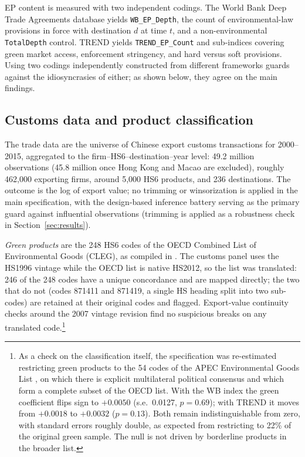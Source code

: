 \documentclass[12pt]{article}
\begin{document}
EP content is measured with two independent codings. The World Bank Deep Trade
Agreements database \citep{hofmann2017} yields \texttt{WB\_EP\_Depth}, the count of
environmental-law provisions in force with destination $d$ at time $t$, and a
non-environmental \texttt{TotalDepth} control. TREND \citep{morin2018} yields
\texttt{TREND\_EP\_Count} and sub-indices covering green market access, enforcement
stringency, and hard versus soft provisions. Using two codings independently constructed
from different frameworks guards against the idiosyncrasies of either; as shown below,
they agree on the main findings.

\subsection{Customs data and product classification}

The trade data are the universe of Chinese export customs transactions for 2000--2015,
aggregated to the firm--HS6--destination--year level: 49.2 million observations (45.8
million once Hong Kong and Macao are excluded), roughly 462{,}000 exporting firms,
around 5{,}000 HS6 products, and 236 destinations. The outcome is the log of export
value; no trimming or winsorization is applied in the main specification, with the
design-based inference battery serving as the primary guard against influential
observations (trimming is applied as a robustness check in Section~\ref{sec:results}).

\emph{Green products} are the 248 HS6 codes of the OECD Combined List of Environmental
Goods (CLEG), as compiled in \citet{sauvage2014}. The customs panel uses the HS1996
vintage while the OECD list is native HS2012, so the list was translated: 246 of the 248
codes have a unique concordance and are mapped directly; the two that do not (codes
871411 and 871419, a single HS heading split into two sub-codes) are retained at their
original codes and flagged. Export-value continuity checks around the 2007 vintage
revision find no suspicious breaks on any translated code.\footnote{As a check on the
classification itself, the specification was re-estimated restricting green products to
the 54 codes of the APEC Environmental Goods List \citep{sauvage2014}, on which there is
explicit multilateral political consensus and which form a complete subset of the OECD
list. With the WB index the green coefficient flips sign to $+0.0050$ (s.e.\ 0.0127,
$p=0.69$); with TREND it moves from $+0.0018$ to $+0.0032$ ($p=0.13$). Both remain
indistinguishable from zero, with standard errors roughly double, as expected from
restricting to 22\% of the original green sample. The null is not driven by borderline
products in the broader list.}
\end{document}
